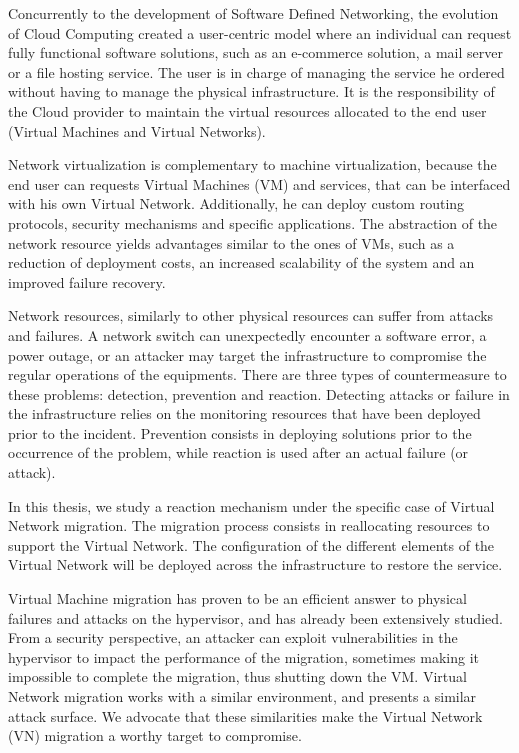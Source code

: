 Concurrently to the development of Software Defined Networking, the evolution of Cloud Computing created a user-centric model where an individual can request fully functional software solutions, such as an e-commerce solution, a mail server or a file hosting service. The user is in charge of managing the service he ordered without having to manage the physical infrastructure.
It is the responsibility of the Cloud provider to maintain the virtual resources allocated to the end user (\eg Virtual Machines and Virtual Networks).


Network virtualization is complementary to machine virtualization, because the end user can requests Virtual Machines (VM) and services, that can be interfaced with his own Virtual Network. Additionally, he can deploy custom routing protocols, security mechanisms and specific applications. The abstraction of the network resource yields advantages similar to the ones of VMs, such as a reduction of deployment costs, an increased scalability of the system and an improved failure recovery.

Network resources, similarly to other physical resources can suffer from attacks and failures. A network switch can unexpectedly encounter a software error, a power outage, or an attacker may target the infrastructure to compromise the regular operations of the equipments. There are three types of countermeasure to these problems: detection, prevention and reaction. Detecting attacks or failure in the infrastructure relies on the monitoring resources that have been deployed prior to the incident. Prevention consists in deploying solutions prior to the occurrence of the problem, while reaction is used after an actual failure (or attack).

In this thesis, we study a reaction mechanism under the specific case of Virtual Network migration.
The migration process consists in reallocating resources to support the Virtual Network.
The configuration of the different elements of the Virtual Network will be deployed across the infrastructure to restore the service.

Virtual Machine migration has proven to be an efficient answer to physical failures and attacks on the hypervisor, and has already been extensively studied. From a security perspective, an attacker can exploit vulnerabilities in the hypervisor to impact the performance of the migration, sometimes making it impossible to complete the migration, thus shutting down the VM.
Virtual Network migration works with a similar environment, and presents a similar attack surface. We advocate that these similarities make the Virtual Network (VN) migration a worthy target to compromise.


